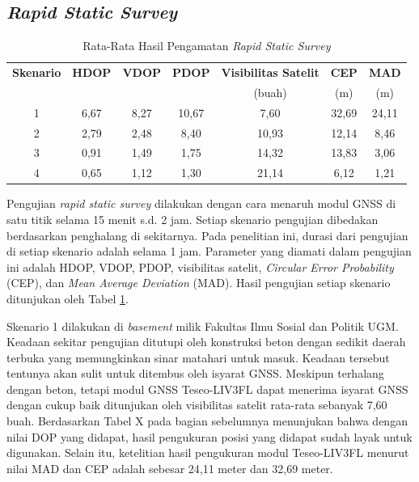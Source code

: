 \documentclass[conference]{IEEEtran}
\begin{document}
\subsection{\textit{Rapid Static Survey}}
\begin{table}[tbp]
	\centering
	\renewcommand{\arraystretch}{1.5}
	\caption{Rata-Rata Hasil Pengamatan \textit{Rapid Static Survey}}
	\label{tab: 4-rss-summary}
	\begin{tabular}{ccccccc}
		\hline
		\textbf{Skenario} & \textbf{HDOP} & \textbf{VDOP} & \textbf{PDOP} & \textbf{Visibilitas Satelit} & \textbf{CEP} & \textbf{MAD} \\
		&  & &  & (buah) & (m) & (m) \\
		\hline
		1 & 6,67 & 8,27 & 10,67 & 7,60 & 32,69 & 24,11 \\
		2 & 2,79 & 2,48 & 8,40 & 10,93 & 12,14 & 8,46 \\
		3 & 0,91 & 1,49 & 1,75 & 14,32 & 13,83 & 3,06 \\
		4 & 0,65 & 1,12 & 1,30 & 21,14 & 6,12 & 1,21 \\
		\hline
	\end{tabular}
\end{table}

Pengujian \textit{rapid static survey} dilakukan dengan cara menaruh modul GNSS di satu titik selama 15 menit s.d. 2 jam. Setiap skenario pengujian dibedakan berdasarkan penghalang di sekitarnya. Pada penelitian ini, durasi dari pengujian di setiap skenario adalah selama 1 jam. Parameter yang diamati dalam pengujian ini adalah HDOP, VDOP, PDOP, visibilitas satelit, \textit{Circular Error Probability} (CEP), dan \textit{Mean Average Deviation} (MAD). Hasil pengujian setiap skenario ditunjukan oleh Tabel \ref{tab: 4-rss-summary}.

Skenario 1 dilakukan di \textit{basement} milik Fakultas Ilmu Sosial dan Politik UGM. Keadaan sekitar pengujian ditutupi oleh konstruksi beton dengan sedikit daerah terbuka yang memungkinkan sinar matahari untuk masuk. Keadaan tersebut tentunya akan sulit untuk ditembus oleh isyarat GNSS. Meskipun terhalang dengan beton, tetapi modul GNSS Teseo-LIV3FL dapat menerima isyarat GNSS dengan cukup baik ditunjukan oleh visibilitas satelit rata-rata sebanyak 7,60 buah. Berdasarkan Tabel X pada bagian sebelumnya menunjukan bahwa dengan nilai DOP yang didapat, hasil pengukuran posisi yang didapat sudah layak untuk digunakan. Selain itu, ketelitian hasil pengukuran modul Teseo-LIV3FL menurut nilai MAD dan CEP adalah sebesar 24,11 meter dan 32,69 meter.
\end{document}
